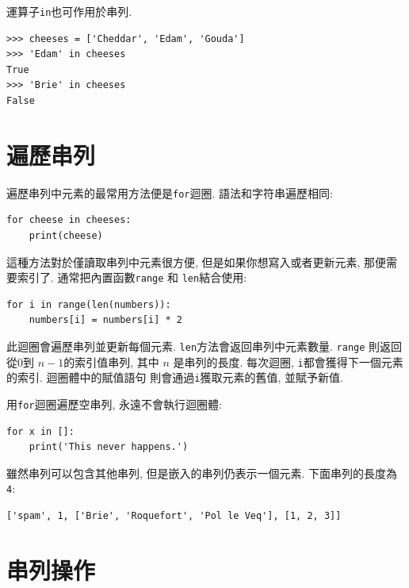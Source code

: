 \documentclass[10pt]{book}
\begin{document}

運算子{\tt in}也可作用於串列. 

\begin{verbatim}
>>> cheeses = ['Cheddar', 'Edam', 'Gouda']
>>> 'Edam' in cheeses
True
>>> 'Brie' in cheeses
False
\end{verbatim}


\section{遍歷串列}

遍歷串列中元素的最常用方法便是{\tt for}迴圈. 語法和字符串遍歷相同:

\begin{verbatim}
for cheese in cheeses:
    print(cheese)
\end{verbatim}
%
這種方法對於僅讀取串列中元素很方便, 但是如果你想寫入或者更新元素, 
那便需要索引了. 
通常把內置函數{\tt range} 和 {\tt len}結合使用:

\begin{verbatim}
for i in range(len(numbers)):
    numbers[i] = numbers[i] * 2
\end{verbatim}
%

此迴圈會遍歷串列並更新每個元素. 
{\tt len}方法會返回串列中元素數量. {\tt range} 則返回從0到 $n-1$的索引值串列, 
其中 $n$ 是串列的長度. 
每次迴圈, {\tt i}都會獲得下一個元素的索引. 迴圈體中的賦值語句
則會通過{\tt i}獲取元素的舊值, 並賦予新值. 

用{\tt for}迴圈遍歷空串列, 永遠不會執行迴圈體:

\begin{verbatim}
for x in []:
    print('This never happens.')
\end{verbatim}
%
雖然串列可以包含其他串列, 但是嵌入的串列仍表示一個元素. 
下面串列的長度為{\tt 4}:

\begin{verbatim}
['spam', 1, ['Brie', 'Roquefort', 'Pol le Veq'], [1, 2, 3]]
\end{verbatim}



\section{串列操作}
\end{document}
